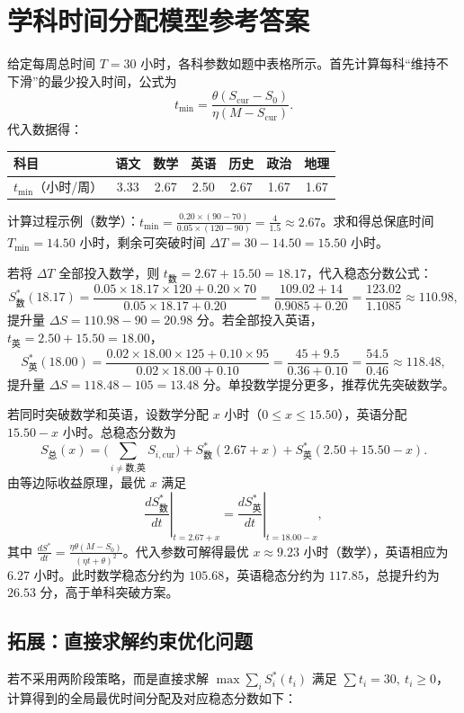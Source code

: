 \documentclass[10pt]{article}
\begin{document}
\section{学科时间分配模型参考答案}

给定每周总时间 $T=30$ 小时，各科参数如题中表格所示。首先计算每科“维持不下滑”的最少投入时间，公式为
$$
t_{\min}=\frac{\theta(S_{\text{cur}}-S_0)}{\eta(M-S_{\text{cur}})}.
$$
代入数据得：

\begin{center}
\begin{tabular}{lcccccc}
\toprule
科目 & 语文 & 数学 & 英语 & 历史 & 政治 & 地理 \\
\midrule
$t_{\min}$（小时/周） & 3.33 & 2.67 & 2.50 & 2.67 & 1.67 & 1.67 \\
\bottomrule
\end{tabular}
\end{center}

计算过程示例（数学）：$t_{\min}=\frac{0.20\times(90-70)}{0.05\times(120-90)}=\frac{4}{1.5}\approx2.67$。求和得总保底时间 $T_{\min}=14.50$ 小时，剩余可突破时间 $\Delta T=30-14.50=15.50$ 小时。

若将 $\Delta T$ 全部投入数学，则 $t_{\text{数}}=2.67+15.50=18.17$，代入稳态分数公式：
$$
S_{\text{数}}^*(18.17)=\frac{0.05\times18.17\times120+0.20\times70}{0.05\times18.17+0.20}=\frac{109.02+14}{0.9085+0.20}=\frac{123.02}{1.1085}\approx110.98,
$$
提升量 $\Delta S=110.98-90=20.98$ 分。若全部投入英语，$t_{\text{英}}=2.50+15.50=18.00$，
$$
S_{\text{英}}^*(18.00)=\frac{0.02\times18.00\times125+0.10\times95}{0.02\times18.00+0.10}=\frac{45+9.5}{0.36+0.10}=\frac{54.5}{0.46}\approx118.48,
$$
提升量 $\Delta S=118.48-105=13.48$ 分。单投数学提分更多，推荐优先突破数学。

若同时突破数学和英语，设数学分配 $x$ 小时（$0\le x\le 15.50$），英语分配 $15.50-x$ 小时。总稳态分数为
$$
S_{\text{总}}(x)=\bigl(\sum_{i\neq\text{数,英}}S_{i,\text{cur}}\bigr)+S_{\text{数}}^*(2.67+x)+S_{\text{英}}^*(2.50+15.50-x).
$$
由等边际收益原理，最优 $x$ 满足
$$
\left.\frac{dS_{\text{数}}^*}{dt}\right|_{t=2.67+x}=\left.\frac{dS_{\text{英}}^*}{dt}\right|_{t=18.00-x},
$$
其中 $\frac{dS^*}{dt}=\frac{\eta\theta(M-S_0)}{(\eta t+\theta)^2}$。代入参数可解得最优 $x\approx9.23$ 小时（数学），英语相应为 $6.27$ 小时。此时数学稳态分约为 $105.68$，英语稳态分约为 $117.85$，总提升约为 $26.53$ 分，高于单科突破方案。

\subsection*{拓展：直接求解约束优化问题}
若不采用两阶段策略，而是直接求解 $\max\sum_i S_i^*(t_i)$ 满足 $\sum t_i=30,\ t_i\ge0$，计算得到的全局最优时间分配及对应稳态分数如下：
\end{document}
